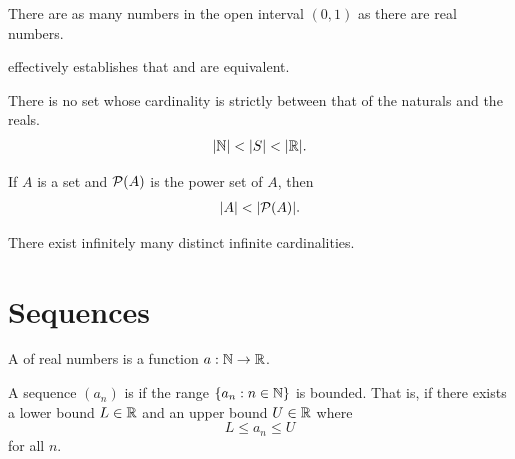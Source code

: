 \documentclass[11pt,twoside=off,numbers=noenddot]{scrbook}
\begin{document}
\begin{theorem}[$\size{(0, 1)} = \size{\RR}$]
    There are as many numbers in the open interval $(0, 1)$ as there are real numbers.
\end{theorem}

\begin{remark}
     effectively establishes that  and  are equivalent.
\end{remark}

\begin{hypothesis}
    There is no set whose cardinality is strictly between that of the naturals and the reals.
    \begin{align*}
        | \mathbb N | < | S | < | \mathbb R |.
    \end{align*}
\end{hypothesis}

\begin{theorem}
    If $A$ is a set and $\mathcal{P}(A)$ is the power set of $A$, then
    \begin{align*}
        | A | < | \mathcal{P}(A) |.
    \end{align*}
\end{theorem}

\begin{corollary}
    There exist infinitely many distinct infinite cardinalities.
\end{corollary}

\chapter{Sequences}
\begin{definition}
    A  of real numbers is a function $a : \mathbb N \to \mathbb R$.
\end{definition}

\begin{definition}
    A sequence $(a_n)$ is  if the range $\{ a_n : n \in \mathbb N \}$ is bounded. That is, if there exists a lower bound $L \in \mathbb R$ and an upper bound $U \in \mathbb R$ where
    \[ L \leq a_n \leq U \]
    for all $n$.
\end{definition}
\end{document}

